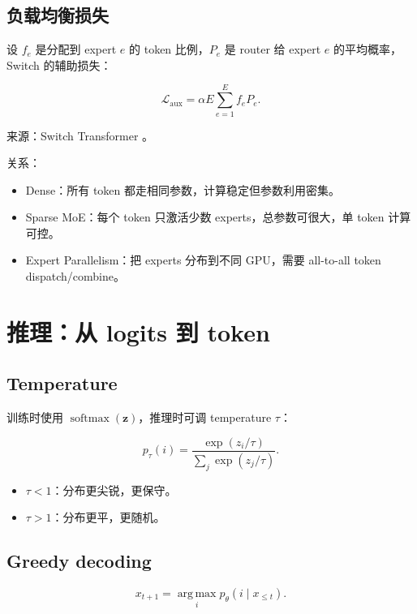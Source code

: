 \documentclass[UTF8,12pt]{ctexart}
\newcommand{\1}{\mathbf{1}}
\newcommand{\softmax}{\operatorname{softmax}}
\newcommand{\argmax}{\operatorname*{arg\,max}}
\begin{document}
\subsection{负载均衡损失}

设 $f_e$ 是分配到 expert $e$ 的 token 比例，$P_e$ 是 router 给 expert $e$ 的平均概率，Switch 的辅助损失：

\begin{equation}
\mathcal{L}_{\mathrm{aux}}
=\alpha E\sum_{e=1}^{E} f_e P_e.
\label{eq:moe-aux}
\end{equation}

来源：Switch Transformer \cite{fedus2021switch}。

关系：

\begin{itemize}
  \item Dense：所有 token 都走相同参数，计算稳定但参数利用密集。
  \item Sparse MoE：每个 token 只激活少数 experts，总参数可很大，单 token 计算可控。
  \item Expert Parallelism：把 experts 分布到不同 GPU，需要 all-to-all token dispatch/combine。
\end{itemize}

\section{推理：从 logits 到 token}

\subsection{Temperature}

训练时使用 $\softmax(\bm{z})$，推理时可调 temperature $\tau$：

\begin{equation}
p_\tau(i)
=\frac{\exp(z_i/\tau)}{\sum_j \exp(z_j/\tau)}.
\label{eq:temperature}
\end{equation}

\begin{itemize}
  \item $\tau<1$：分布更尖锐，更保守。
  \item $\tau>1$：分布更平，更随机。
\end{itemize}

\subsection{Greedy decoding}

\begin{equation}
x_{t+1}=\argmax_i p_\theta(i\mid x_{\le t}).
\end{equation}
\end{document}
